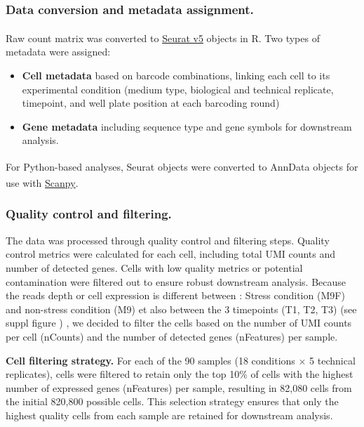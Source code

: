\documentclass[
  11pt,
  a4paper,
]{report}
\providecommand{\tightlist}{%
  \setlength{\itemsep}{0pt}\setlength{\parskip}{0pt}}\usepackage{longtable,booktabs,array}
\begin{document}
\subsubsection{Data conversion and metadata
assignment.}\label{data-conversion-and-metadata-assignment.}

Raw count matrix was converted to
\href{https://satijalab.org/seurat/}{Seurat v5}
objects\textsuperscript{} in R. Two types of
metadata were assigned:

\begin{itemize}
\tightlist
\item
  \textbf{Cell metadata} based on barcode combinations, linking each
  cell to its experimental condition (medium type, biological and
  technical replicate, timepoint, and well plate position at each
  barcoding round)
\end{itemize}

\begin{itemize}
\tightlist
\item
  \textbf{Gene metadata} including sequence type and gene symbols for
  downstream analysis.
\end{itemize}

For Python-based analyses, Seurat objects were converted to AnnData
objects\textsuperscript{} for use with
\href{https://scanpy.readthedocs.io/en/stable/}{Scanpy}\textsuperscript{}.

\subsubsection{Quality control and
filtering.}\label{quality-control-and-filtering.}

The data was processed through quality control and filtering steps.
Quality control metrics were calculated for each cell, including total
UMI counts and number of detected genes. Cells with low quality metrics
or potential contamination were filtered out to ensure robust downstream
analysis. Because the reads depth or cell expression is different
between : Stress condition (M9F) and non-stress condition (M9) et also
between the 3 timepoints (T1, T2, T3) (see suppl figure ) , we decided
to filter the cells based on the number of UMI counts per cell (nCounts)
and the number of detected genes (nFeatures) per sample.

\textbf{Cell filtering strategy.} For each of the 90 samples (18
conditions × 5 technical replicates), cells were filtered to retain only
the top 10\% of cells with the highest number of expressed genes
(nFeatures) per sample, resulting in 82,080 cells from the initial
820,800 possible cells. This selection strategy ensures that only the
highest quality cells from each sample are retained for downstream
analysis.
\end{document}
